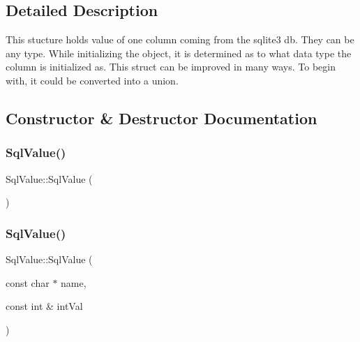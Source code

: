 \subsection{Detailed Description}
This stucture holds value of one column coming from the sqlite3 db. They can be any type. While initializing the object, it is determined as to what data type the column is initialized as. This struct can be improved in many ways. To begin with, it could be converted into a union. 

\subsection{Constructor \& Destructor Documentation}
\mbox{\label{structSqlValue_a35ecbd8591181b12dbbc954046a6380a}} 
\subsubsection{\texorpdfstring{Sql\+Value()}{SqlValue()}\hspace{0.1cm}{\footnotesize\ttfamily [1/5]}}
{\footnotesize\ttfamily Sql\+Value\+::\+Sql\+Value (\begin{DoxyParamCaption}{ }\end{DoxyParamCaption})\hspace{0.3cm}{\ttfamily [default]}}

\mbox{\label{structSqlValue_ad1e1270b387de26ffdabb4a702304446}} 
\subsubsection{\texorpdfstring{Sql\+Value()}{SqlValue()}\hspace{0.1cm}{\footnotesize\ttfamily [2/5]}}
{\footnotesize\ttfamily Sql\+Value\+::\+Sql\+Value (\begin{DoxyParamCaption}\item[{const char $\ast$}]{name,  }\item[{const int \&}]{int\+Val }\end{DoxyParamCaption})\hspace{0.3cm}{\ttfamily [inline]}}

\mbox{\label{structSqlValue_a434e7637b0a06e43c2d1b84556470f53}} 
